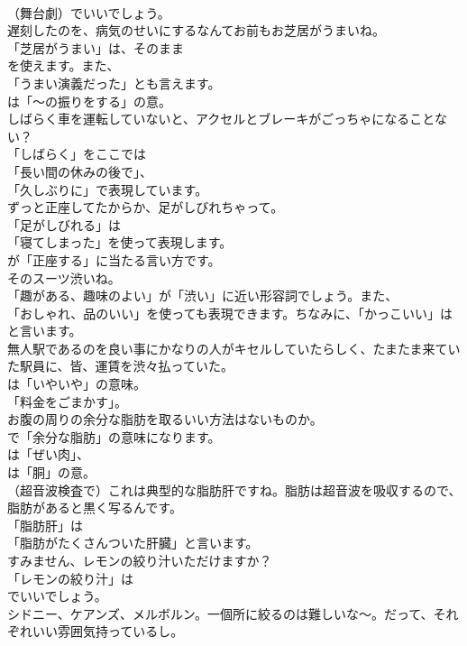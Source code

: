 \documentclass[8pt]{extreport}
\begin{document}
\begin{CJK}{UTF8}{min}
\\	（舞台劇）でいいでしょう。	
\\	遅刻したのを、病気のせいにするなんてお前もお芝居がうまいね。 
\\	「芝居がうまい」は、そのまま
\\	を使えます。また、
\\	「うまい演義だった」とも言えます。
\\	は「～の振りをする」の意。	
\\	しばらく車を運転していないと、アクセルとブレーキがごっちゃになることない？ 
\\	「しばらく」をここでは
\\	「長い間の休みの後で」、
\\	「久しぶりに」で表現しています。	
\\	ずっと正座してたからか、足がしびれちゃって。 
\\	「足がしびれる」は
\\	「寝てしまった」を使って表現します。
\\	が「正座する」に当たる言い方です。	
\\	そのスーツ渋いね。 
\\	「趣がある、趣味のよい」が「渋い」に近い形容詞でしょう。また、
\\	「おしゃれ、品のいい」を使っても表現できます。ちなみに、「かっこいい」は
\\	と言います。	
\\	無人駅であるのを良い事にかなりの人がキセルしていたらしく、たまたま来ていた駅員に、皆、運賃を渋々払っていた。 
\\	は「いやいや」の意味。
\\	「料金をごまかす」。	
\\	お腹の周りの余分な脂肪を取るいい方法はないものか。 
\\	で「余分な脂肪」の意味になります。
\\	は「ぜい肉」、
\\	は「胴」の意。	
\\	（超音波検査で）これは典型的な脂肪肝ですね。脂肪は超音波を吸収するので、脂肪があると黒く写るんです。 
\\	「脂肪肝」は
\\	「脂肪がたくさんついた肝臓」と言います。	
\\	すみません、レモンの絞り汁いただけますか？ 
\\	「レモンの絞り汁」は 
\\	でいいでしょう。	
\\	シドニー、ケアンズ、メルボルン。一個所に絞るのは難しいな～。だって、それぞれいい雰囲気持っているし。 

\end{CJK}
\end{document}
